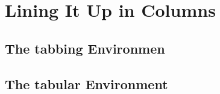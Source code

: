 \section{Lining It Up in Columns}
\subsection{The tabbing Environmen}


\subsection{The tabular Environment}